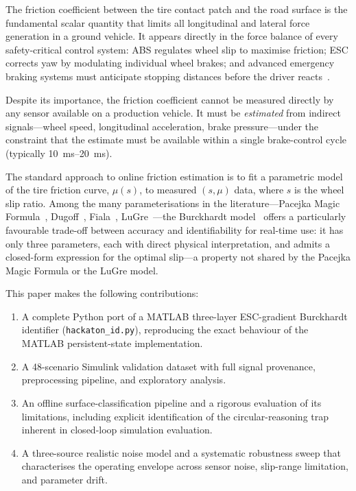 \documentclass[11pt,a4paper]{article}
\begin{document}
The friction coefficient between the tire contact patch and the road surface is
the fundamental scalar quantity that limits all longitudinal and lateral force
generation in a ground vehicle.
It appears directly in the force balance of every safety-critical control system:
ABS regulates wheel slip to maximise friction; ESC corrects yaw by modulating
individual wheel brakes; and advanced emergency braking systems must anticipate
stopping distances before the driver reacts~\cite{rajamani2012,pacejka2006}.

Despite its importance, the friction coefficient cannot be measured directly by
any sensor available on a production vehicle.
It must be \emph{estimated} from indirect signals---wheel speed, longitudinal
acceleration, brake pressure---under the constraint that the estimate must be
available within a single brake-control cycle (typically \SIrange{10}{20}{\milli\second}).

The standard approach to online friction estimation is to fit a parametric model
of the tire friction curve, $\mu(s)$, to measured $(s, \mu)$ data, where $s$ is
the wheel slip ratio.
Among the many parameterisations in the literature---Pacejka Magic
Formula~\cite{pacejka2006}, Dugoff~\cite{dugoff1970}, Fiala~\cite{fiala1954},
LuGre~\cite{canudas1995}---the Burckhardt model~\cite{burckhardt1993} offers a particularly favourable
trade-off between accuracy and identifiability for real-time use: it has only
three parameters, each with direct physical interpretation, and admits a
closed-form expression for the optimal slip---a property not shared by the
Pacejka Magic Formula or the LuGre model.

This paper makes the following contributions:
\begin{enumerate}
  \item A complete Python port of a MATLAB three-layer ESC-gradient Burckhardt
        identifier (\texttt{hackaton\_id.py}), reproducing the exact behaviour
        of the MATLAB persistent-state implementation.
  \item A 48-scenario Simulink validation dataset with full signal provenance,
        preprocessing pipeline, and exploratory analysis.
  \item An offline surface-classification pipeline and a rigorous evaluation of
        its limitations, including explicit identification of the circular-reasoning
        trap inherent in closed-loop simulation evaluation.
  \item A three-source realistic noise model and a systematic robustness sweep that
        characterises the operating envelope across sensor noise, slip-range limitation,
        and parameter drift.
\end{enumerate}
\end{document}
